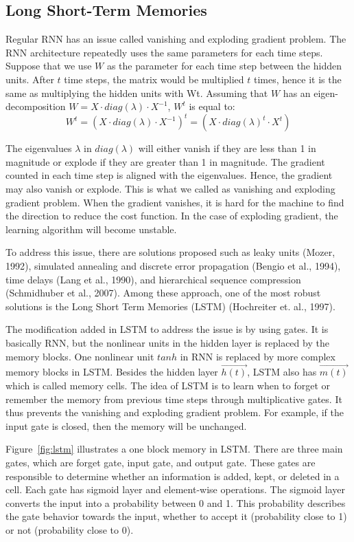 \subsection{Long Short-Term Memories}
Regular RNN has an issue called vanishing and exploding gradient problem. The RNN architecture repeatedly uses the same parameters for each time steps. Suppose that we use $W$ as the parameter for each time step between the hidden units. After $t$ time steps, the matrix would be multiplied $t$ times, hence it is the same as multiplying the hidden units with Wt. Assuming that $W$ has an eigen-decomposition $W = X \cdot diag(\lambda) \cdot X^{-1}$, $W^{t}$ is equal to:
\begin{equation}
W^{t} = (X \cdot diag(\lambda) \cdot X^{-1})^{t} = (X \cdot diag(\lambda)^{t} \cdot X^{t})
\end{equation}

The eigenvalues $\lambda$ in $diag(\lambda)$ will either vanish if they are less than 1 in magnitude or explode if they are greater than 1 in magnitude. The gradient counted in each time step is aligned with the eigenvalues. Hence, the gradient may also vanish or explode. This is what we called as vanishing and exploding gradient problem. When the gradient vanishes, it is hard for the machine to find the direction to reduce the cost function. In the case of exploding gradient, the learning algorithm will become unstable.

To address this issue, there are solutions proposed such as leaky units (Mozer, 1992), simulated annealing and discrete error propagation (Bengio et al., 1994), time delays (Lang et al., 1990), and hierarchical sequence compression (Schmidhuber et al., 2007). Among these approach, one of the most robust solutions is the Long Short Term Memories (LSTM) (Hochreiter et. al., 1997). 

The modification added in LSTM to address the issue is by using gates. It is basically RNN, but the nonlinear units in the hidden layer is replaced by the memory blocks. One nonlinear unit $tanh$ in RNN is replaced by more complex memory blocks in LSTM. Besides the hidden layer $\vec{h(t)}$, LSTM also has $\vec{m(t)}$ which is called memory cells.  The idea of LSTM is to learn when to forget or remember the memory from previous time steps through multiplicative gates. It thus prevents the vanishing and exploding gradient problem. For example, if the input gate is closed, then the memory will be unchanged.

Figure~\ref{fig:lstm} illustrates a one block memory in LSTM. There are three main gates, which are forget gate, input gate, and output gate. These gates are responsible to determine whether an information is added, kept, or deleted in a cell. Each gate has sigmoid layer and element-wise operations. The sigmoid layer converts the input into a probability between 0 and 1. This probability describes the gate behavior towards the input, whether to accept it (probability close to 1) or not (probability close to 0). 

